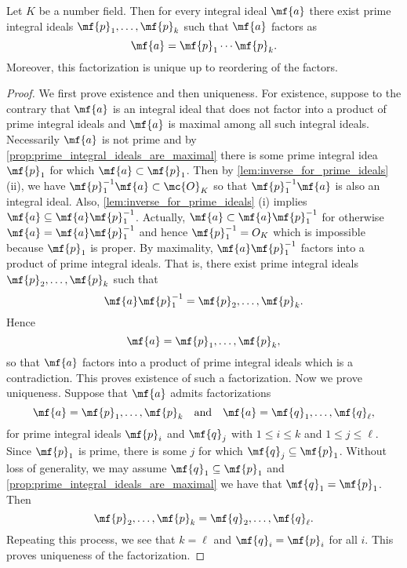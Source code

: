     \begin{theorem}\label{thm:unique_product_prime_ideals}
      Let $K$ be a number field. Then for every integral ideal $\mf{a}$ there exist prime integral ideals $\mf{p}_{1},\ldots,\mf{p}_{k}$ such that $\mf{a}$ factors as
      \[
        \mf{a} = \mf{p}_{1} \cdots \mf{p}_{k}.
      \]
      Moreover, this factorization is unique up to reordering of the factors.
    \end{theorem}
    \begin{proof}
      We first prove existence and then uniqueness. For existence, suppose to the contrary that $\mf{a}$ is an integral ideal that does not factor into a product of prime integral ideals and $\mf{a}$ is maximal among all such integral ideals. Necessarily $\mf{a}$ is not prime and by \cref{prop:prime_integral_ideals_are_maximal} there is some prime integral idea $\mf{p}_{1}$ for which $\mf{a} \subset \mf{p}_{1}$. Then by \cref{lem:inverse_for_prime_ideals} (ii), we have $\mf{p}_{1}^{-1}\mf{a} \subset \mc{O}_{K}$ so that $\mf{p}_{1}^{-1}\mf{a}$ is also an integral ideal. Also, \cref{lem:inverse_for_prime_ideals} (i) implies $\mf{a} \subseteq \mf{a}\mf{p}_{1}^{-1}$. Actually, $\mf{a} \subset \mf{a}\mf{p}_{1}^{-1}$ for otherwise $\mf{a} = \mf{a}\mf{p}_{1}^{-1}$ and hence $\mf{p}_{1}^{-1} = {O}_{K}$ which is impossible because $\mf{p}_{1}$ is proper. By maximality, $\mf{a}\mf{p}_{1}^{-1}$ factors into a product of prime integral ideals. That is, there exist prime integral ideals $\mf{p}_{2},\ldots,\mf{p}_{k}$ such that
      \[
        \mf{a}\mf{p}_{1}^{-1} = \mf{p}_{2},\ldots,\mf{p}_{k}.
      \]
      Hence
      \[
        \mf{a} = \mf{p}_{1},\ldots,\mf{p}_{k},
      \]
      so that $\mf{a}$ factors into a product of prime integral ideals which is a contradiction. This proves existence of such a factorization. Now we prove uniqueness. Suppose that $\mf{a}$ admits factorizations
      \[
        \mf{a} = \mf{p}_{1},\ldots,\mf{p}_{k} \quad \text{and} \quad \mf{a} = \mf{q}_{1},\ldots,\mf{q}_{\ell},
      \]
      for prime integral ideals $\mf{p}_{i}$ and $\mf{q}_{j}$ with $1 \le i \le k$ and $1 \le j \le \ell$. Since $\mf{p}_{1}$ is prime, there is some $j$ for which $\mf{q}_{j} \subseteq \mf{p}_{1}$. Without loss of generality, we may assume $\mf{q}_{1} \subseteq \mf{p}_{1}$ and \cref{prop:prime_integral_ideals_are_maximal} we have that $\mf{q}_{1} = \mf{p}_{1}$. Then
      \[
        \mf{p}_{2},\ldots,\mf{p}_{k} = \mf{q}_{2},\ldots,\mf{q}_{\ell}.
      \]
      Repeating this process, we see that $k = \ell$ and $\mf{q}_{i} = \mf{p}_{i}$ for all $i$. This proves uniqueness of the factorization.
    \end{proof}

